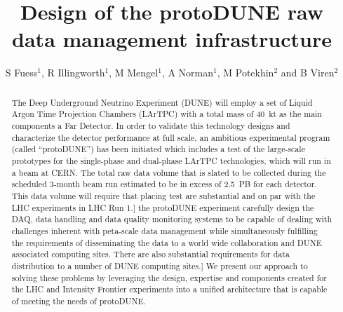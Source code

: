 \documentclass[a4paper]{jpconf}
\newcommand{\Omit}[1]{}
\newcommand{\pd}{protoDUNE\xspace}
\begin{document}
\title{Design of the \pd raw data management infrastructure}

\author{S Fuess$^1$, R Illingworth$^1$, M Mengel$^1$, A Norman$^1$, M Potekhin$^2$ and B Viren$^2$}

\address{$^1$ Fermi National Accelerator Laboratory, Batavia, IL 60510, USA}
\address{$^2$ Brookhaven National Laboratory, Upton, NY 11973, USA}


\begin{abstract}
The Deep Underground Neutrino Experiment (DUNE) will employ a set of Liquid Argon
Time Projection Chambers (LArTPC) with a total mass of 40~kt as the
main components a Far Detector.
In order to validate this technology designs and characterize the
detector performance at full scale, an
ambitious experimental program (called ``\pd'') has been
initiated which includes a test of the large-scale prototypes for the
single-phase and dual-phase LArTPC technologies, which will run in a beam
at CERN. The total raw data volume
that is slated to be collected during the scheduled 3-month beam run
estimated to be in excess of 2.5~PB for each detector.  This data
volume will require that \Omit[placing
test  are substantial and on par with the LHC experiments in LHC Run 1.]
the protoDUNE experiment carefully design the DAQ, data handling and
data quality monitoring systems to be capable of dealing with
challenges inherent with peta-scale data management while
simultaneously fulfilling the requirements of disseminating the data to
a world wide collaboration and DUNE associated computing sites. \Omit[There are also substantial requirements for data distribution
to a number of DUNE computing sites.] We present our approach to solving these problems by
leveraging the design, expertise and components created for the LHC and Intensity Frontier
experiments into a unified architecture that is capable of meeting the
needs of \pd. 
\end{abstract}
\end{document}
